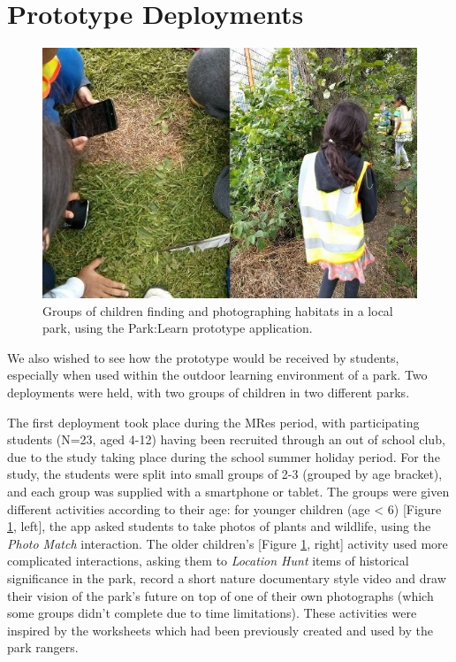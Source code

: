 \section{Prototype Deployments}

\begin{figure}
  \centering
  \includegraphics[width=0.8\columnwidth]{images/chapter04/prototypeDeployment.jpg}
  \caption[Children during the Park:Learn summer school deployment]{Groups of children finding and photographing habitats in a local park, using the Park:Learn prototype application.}
  \label{fig:prototypeDeployment}
\end{figure}

We also wished to see how the prototype would be received by students, especially when used within the outdoor learning environment of a park. Two deployments were held, with two groups of children in two different parks. 

The first deployment took place during the MRes period, with participating students (N=23, aged 4-12) having been recruited through an out of school club, due to the study taking place during the school summer holiday period. For the study, the students were split into small groups of 2-3 (grouped by age bracket), and each group was supplied with a smartphone or tablet. The groups were given different activities according to their age: for younger children (age < 6) [Figure \ref{fig:prototypeDeployment}, left], the app asked students to take photos of plants and wildlife, using the \textit{Photo Match} interaction. The older children's [Figure \ref{fig:prototypeDeployment}, right] activity used more complicated interactions, asking them to \textit{Location Hunt} items of historical significance in the park, record a short nature documentary style video and draw their vision of the park’s future on top of one of their own photographs (which some groups didn’t complete due to time limitations). These activities were inspired by the worksheets which had been previously created and used by the park rangers.


